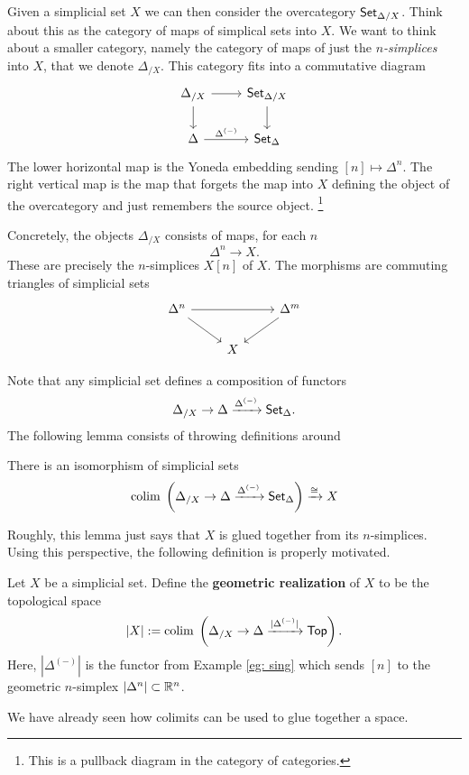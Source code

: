\documentclass[11pt]{amsart}
\def\Top{{\sf Top}}
\def\colim{{\rm colim}\;}
\begin{document}
Given a simplicial set $X$ we can then consider the overcategory ${\sf Set}_{\Delta / X}$.
Think about this as the category of maps of simplical sets into $X$.
We want to think about a smaller category, namely the category of maps of just the {\em $n$-simplices} into $X$, that we denote $\Delta_{/ X}$. 
This category fits into a commutative diagram
\[
\begin{tikzcd}
\Delta_{/X} \ar[r] \ar[d] & \Set_{\Delta / X} \ar[d] \\
\Delta \ar[r, "\Delta^{(-)}"] & \Set_{\Delta}
\end{tikzcd}
\]
The lower horizontal map is the Yoneda embedding sending $[n] \mapsto \Delta^n$. 
The right vertical map is the map that forgets the map into $X$ defining the object of the overcategory and just remembers the source object. \footnote{This is a pullback diagram in the category of categories.}

Concretely, the objects $\Delta_{/X}$ consists of maps, for each $n$
\[
\Delta^n \to X .
\]
These are precisely the $n$-simplices $X[n]$ of $X$. 
The morphisms are commuting triangles of simplicial sets
\[
\begin{tikzcd}
\Delta^n \ar[rr] \ar[dr] & & \Delta^m \ar[dl] \\
& X & 
\end{tikzcd}
\]

Note that any simplicial set defines a composition of functors
\[
\Delta_{/X} \to \Delta \xrightarrow{\Delta^{(-)}} {\sf Set}_{\Delta} .
\]
The following lemma consists of throwing definitions around

\begin{lem}
There is an isomorphism of simplicial sets
\[
\colim \left(\Delta_{/X} \to \Delta \xto{\Delta^{(-)}} \Set_{\Delta} \right) \xto{\cong} X
\]
\end{lem}

Roughly, this lemma just says that $X$ is glued together from its $n$-simplices.
Using this perspective, the following definition is properly motivated. 

\begin{dfn}
Let $X$ be a simplicial set. 
Define the {\bf geometric realization} of $X$ to be the topological space
\[
|X| := \colim \left(\Delta_{/X} \to \Delta \xto{|\Delta^{(-)}|} \Top \right) .
\]
Here, $|\Delta^{(-)}|$ is the functor from Example \ref{eg: sing} which sends $[n]$ to the geometric $n$-simplex $|\Delta^n| \subset \mathbb R^n$.
\end{dfn}

We have already seen how colimits can be used to glue together a space.
\end{document}
